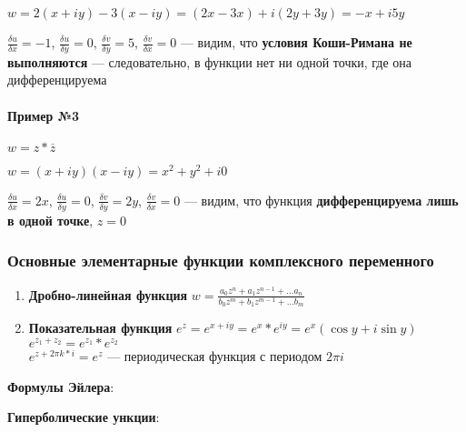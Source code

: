 \documentclass{article}
\begin{document}
$w = 2 (x + i y) - 3 (x - i y) = (2 x - 3 x) + i (2y + 3 y) = -x + i 5 y$

$\frac{\delta u}{\delta x} = -1$, $\frac{\delta u}{\delta y} = 0$, $\frac{\delta v}{\delta y} = 5$, $\frac{\delta v}{\delta x} = 0$ — видим, что \textbf{условия Коши-Римана не выполняются} — следовательно, в функции нет ни одной точки, где она дифференцируема

\paragraph{Пример №3}

$w = z * \overline{z}$

$w = (x + iy) (x - iy) = x^2 + y^2 + i 0$

$\frac{\delta u}{\delta x} = 2 x$, $\frac{\delta u}{\delta y} = 0$, $\frac{\delta v}{\delta y} = 2 y$, $\frac{\delta v}{\delta x} = 0$ — видим, что функция \textbf{дифференцируема лишь в одной точке}, $z = 0$

\subsubsection{Основные элементарные функции комплексного переменного}

\begin{enumerate}
    \item \textbf{Дробно-линейная функция} $w = \frac{a_0 z^{n} + a_1 z^{n - 1} + \dots a_{n}}{b_0 z^{m} + b_1 z^{m - 1} + \dots b_{m}}$
    \item \textbf{Показательная функция} $e^{z} = e^{x + i y} = e^{x} * e^{i y} = e^{x} (\cos y + i \sin y)$ \\
    $e^{z_1 + z_2} = e^{z_1} * e^{z_2}$ \\
    $e^{z + 2 \pi k * i} = e^{z}$ — периодическая функция с периодом $2 \pi i$
\end{enumerate}

\textbf{Формулы Эйлера}:
\begin{multienumerate}
\end{multienumerate}

\textbf{Гиперболические ункции}:
\begin{multienumerate}
\end{multienumerate}
\end{document}
